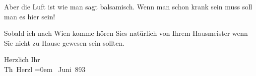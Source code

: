 \pstart
           Aber die Luft ist wie man sagt balsamisch. Wenn man schon krank sein muss soll man es
               hier sein!\pend
           
\pstart
           Sobald ich nach Wien komme hören Sies natürlich
               von Ihrem Hausmeister wenn Sie nicht zu Hause gewesen sein sollten.\pend
           
\pstart
           Herzlich Ihr{\\[\baselineskip]}\spacefill\mbox{Th Herzl}\pend
           \leftskip=0em{}
 Juni 893\pend
           \endnumbering{}  \newcommand{\dateiname}{L03831}\newcommand{\titel}{Theodor Herzl an Arthur Schnitzler, 29. 6. 1893}\newcommand{\editorInnen}{Selma Jahnke und Martin Anton Müller}

